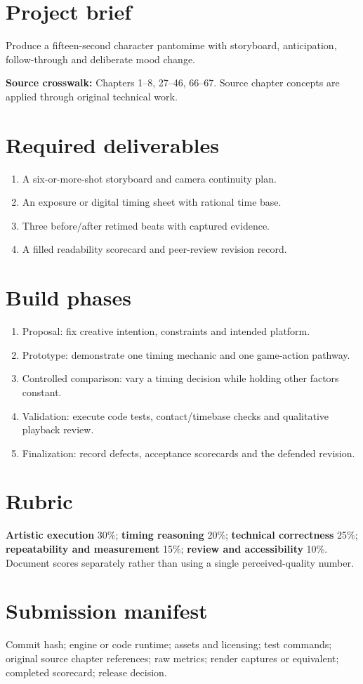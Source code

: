 \documentclass[10pt,letterpaper]{article}
\begin{document}
\makedoctitle
\makedocsummary
\tableofcontents\clearpage
\section{Project brief}
Produce a fifteen-second character pantomime with storyboard, anticipation, follow-through and deliberate mood change.\par\textbf{Source crosswalk:} Chapters 1--8, 27--46, 66--67. Source chapter concepts are applied through original technical work.
\section{Required deliverables}
\begin{enumerate}
\item A six-or-more-shot storyboard and camera continuity plan.
\item An exposure or digital timing sheet with rational time base.
\item Three before/after retimed beats with captured evidence.
\item A filled readability scorecard and peer-review revision record.
\end{enumerate}
\section{Build phases}
\begin{enumerate}
\item Proposal: fix creative intention, constraints and intended platform.
\item Prototype: demonstrate one timing mechanic and one game-action pathway.
\item Controlled comparison: vary a timing decision while holding other factors constant.
\item Validation: execute code tests, contact/timebase checks and qualitative playback review.
\item Finalization: record defects, acceptance scorecards and the defended revision.
\end{enumerate}
\section{Rubric}
\textbf{Artistic execution} 30\%; \textbf{timing reasoning} 20\%; \textbf{technical correctness} 25\%; \textbf{repeatability and measurement} 15\%; \textbf{review and accessibility} 10\%. Document scores separately rather than using a single perceived-quality number.
\section{Submission manifest}
Commit hash; engine or code runtime; assets and licensing; test commands; original source chapter references; raw metrics; render captures or equivalent; completed scorecard; release decision.
\end{document}
